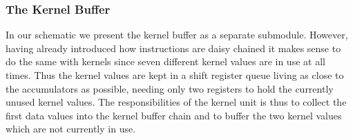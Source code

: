 \subsubsection{The Kernel Buffer}
In our schematic we present the kernel buffer as a separate submodule. 
However, having already introduced how instructions are daisy chained it makes sense to do the same with kernels since seven different kernel values are in use at all times.
Thus the kernel values are kept in a shift register queue living as close to the accumulators as possible, needing only two registers to hold the currently unused kernel values.
The responsibilities of the kernel unit is thus to collect the first data values into the kernel buffer chain and to buffer the two kernel values which are not currently in use.
